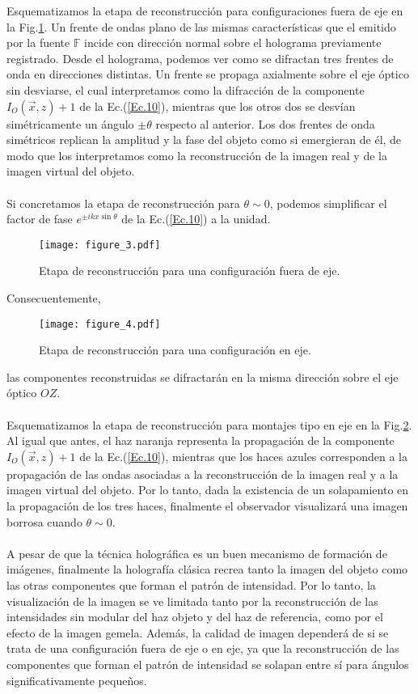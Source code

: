 \documentclass[12pt]{article}
\begin{document}
Esquematizamos la etapa de reconstrucción para configuraciones fuera de eje en la Fig.\ref{figura3}. Un frente de ondas plano de las mismas características que el emitido por la fuente $\mathbb{F}$ incide con dirección normal sobre el holograma previamente registrado. Desde el holograma, podemos ver como se difractan tres frentes de onda en direcciones distintas. Un frente se propaga axialmente sobre el eje óptico sin desviarse, el cual interpretamos como  la  difracción de la componente $I_O (\Vec{x}, z) +  1 $ de la Ec.(\ref{Ec.10}), mientras que los otros dos se desvían simétricamente un ángulo  $\pm \theta$ respecto al anterior. Los dos frentes de onda  simétricos replican la amplitud y la fase del objeto como si emergieran de él, de modo que los interpretamos como la reconstrucción de la imagen real y de la imagen virtual del objeto.  \\ \\
Si concretamos la etapa de reconstrucción  para $ \theta \sim 0$, podemos simplificar el factor de fase  $ e^{\pm i k x \sin{\theta}}$ de la Ec.(\ref{Ec.10}) a la unidad.
\begin{figure}[t!]
    \centering
    \texttt{[image: figure\_3.pdf]}
    \caption{Etapa de reconstrucción para una configuración fuera de eje.}
    \label{figura3}
\end{figure}
Consecuentemente,
\begin{figure}[b!]
    \centering
    \texttt{[image: figure\_4.pdf]}
    \caption{Etapa de reconstrucción para una configuración en eje.}
    \label{figura4}
\end{figure}
las componentes reconstruidas se difractarán en la misma dirección sobre el eje óptico $OZ$.  \\ \\
Esquematizamos la etapa de reconstrucción para montajes tipo en eje en la Fig.\ref{figura4}. Al igual que antes, el haz naranja representa la propagación de la componente $I_O (\Vec{x}, z) +  1 $ de la Ec.(\ref{Ec.10}), mientras que los haces azules corresponden a la propagación de las ondas asociadas a la reconstrucción de la imagen real y a la imagen virtual del objeto. Por lo tanto, dada la existencia de un solapamiento en la propagación de los tres haces, finalmente  el observador visualizará una imagen borrosa cuando $\theta \sim 0$. \\ \\
A pesar de que la técnica holográfica es un buen mecanismo  de formación de imágenes,  finalmente la holografía clásica recrea tanto la imagen del objeto como  las otras componentes que forman el patrón de intensidad. Por lo tanto, la visualización de la imagen se ve limitada tanto  por  la reconstrucción de las intensidades  sin modular del haz objeto y del haz de referencia, como por el efecto de la imagen gemela. Además, la calidad de imagen dependerá de si se trata de una configuración fuera de eje o en eje, ya que la reconstrucción de las componentes que forman el patrón de intensidad se solapan entre sí para ángulos significativamente pequeños. \\ \\
\end{document}
